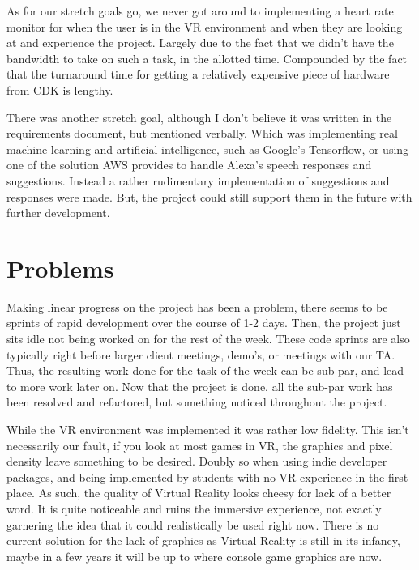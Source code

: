 \documentclass[onecolumn, draftclsnofoot,10pt, compsoc]{IEEEtran}
\begin{document}
As for our stretch goals go, we never got around to implementing a heart rate monitor for when the user is in the VR environment and when they are looking at and experience the project. Largely due to the fact that we didn't have the bandwidth to take on such a task, in the allotted time. Compounded by the fact that the turnaround time for getting a relatively expensive piece of hardware from CDK is lengthy. \newline

There was another stretch goal, although I don't believe it was written in the requirements document, but mentioned verbally. Which was implementing real machine learning and artificial intelligence, such as Google's Tensorflow, or using one of the solution AWS provides to handle Alexa's speech responses and suggestions. Instead a rather rudimentary implementation of suggestions and responses were made. But, the project could still support them in the future with further development. \newline


\section{Problems}
Making linear progress on the project has been a problem, there seems to be sprints of rapid development over the course of 1-2 days. Then, the project just sits idle not being worked on for the rest of the week. These code sprints are also typically right before larger client meetings, demo's, or meetings with our TA. Thus, the resulting work done for the task of the week can be sub-par, and lead to more work later on. Now that the project is done, all the sub-par work has been resolved and refactored, but something noticed throughout the project. \newline

While the VR environment was implemented it was rather low fidelity. This isn't necessarily our fault, if you look at most games in VR, the graphics and pixel density leave something to be desired. Doubly so when using indie developer packages, and being implemented by students with no VR experience in the first place. As such, the quality of Virtual Reality looks cheesy for lack of a better word. It is quite noticeable and ruins the immersive experience, not exactly garnering the idea that it could realistically be used right now. There is no current solution for the lack of graphics as Virtual Reality is still in its infancy, maybe in a few years it will be up to where console game graphics are now. \newline
\end{document}
